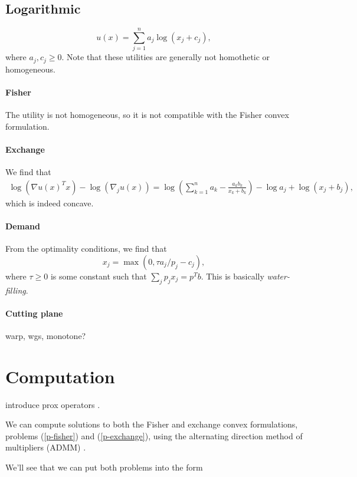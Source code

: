 \documentclass[12pt]{article}
\begin{document}
\subsection{Logarithmic}
\[
u(x) = \sum_{j=1}^n a_j \log(x_j+ c_j),
\]
where $a_j, c_j \geq 0$.
Note that these utilities are generally not homothetic or
homogeneous.

\paragraph{Fisher}
The utility is not homogeneous, so it is not compatible
with the Fisher convex formulation.

\paragraph{Exchange}
We find that 
\begin{align*}
\log(\nabla u(x)^T x) - \log(\nabla_j u(x)) =
\log\left(\sum_{k=1}^n a_k - \frac{a_k b_k}{x_k+b_k} \right) - \log a_j + \log (x_j + b_j),
\end{align*}
which is indeed concave.

\paragraph{Demand}
From the optimality conditions, we find that
\[
x_j = \max(0, \tau a_j/p_j - c_j),
\]
where $\tau \geq 0$ is some constant such that $\sum_j p_j x_j = p^Tb$.
This is basically \emph{water-filling}.

\paragraph{Cutting plane}
warp, wgs, monotone?


\section{Computation}
\label{sec:computation}
introduce prox operators \cite{parikh2013proximal, boyd2011distributed}.

We can compute solutions to both the Fisher and exchange convex
formulations, problems (\ref{p-fisher}) and (\ref{p-exchange}), using
the alternating direction method of multipliers (ADMM) \cite{boyd2011distributed}.

We'll see that we can put both problems into the form
\end{document}
